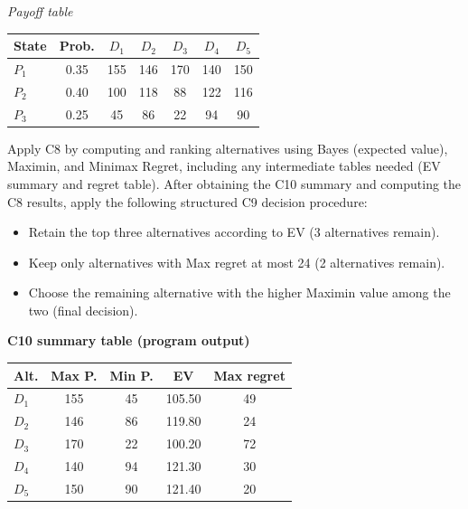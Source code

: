 \begin{ExamProblems}
		\begin{center}
			\textit{Payoff table} \\
			\begin{tabular}{l c c c c c c}
				\hline
				State& Prob. & $D_1$ & $D_2$ & $D_3$ & $D_4$ & $D_5$ \\
				\hline
				$P_1$ & 0.35 & 155 & 146 & 170 & 140 & 150 \\
				$P_2$ & 0.40 & 100 & 118 & 88 & 122 & 116 \\
				$P_3$ & 0.25 & 45 & 86 & 22 & 94 & 90 \\
				\hline
			\end{tabular}
		\end{center}
		
		Apply C8 by computing and ranking alternatives using Bayes (expected value), Maximin, and Minimax Regret, including any intermediate tables needed (EV summary and regret table).
		After obtaining the C10 summary and computing the C8 results, apply the following structured C9 decision procedure:
		\begin{itemize}
			\item Retain the top three alternatives according to EV (3 alternatives remain).
			\item Keep only alternatives with Max regret at most 24 (2 alternatives remain).
			\item Choose the remaining alternative with the higher Maximin value among the two (final decision).
		\end{itemize}
		
		\vspace{0.25cm}
		
		\textbf{C10 summary table (program output)}\par
		\begin{center}
			\begin{tabular}{l c c c c}
				\hline
				Alt. & Max P. & Min P. & EV & Max regret \\
				\hline
				$D_1$ & 155 & 45 & 105.50 & 49 \\
				$D_2$ & 146 & 86 & 119.80 & 24 \\
				$D_3$ & 170 & 22 & 100.20 & 72 \\
				$D_4$ & 140 & 94 & 121.30 & 30 \\
				$D_5$ & 150 & 90 & 121.40 & 20 \\
				\hline
			\end{tabular}
		\end{center}
		

\end{ExamProblems}
